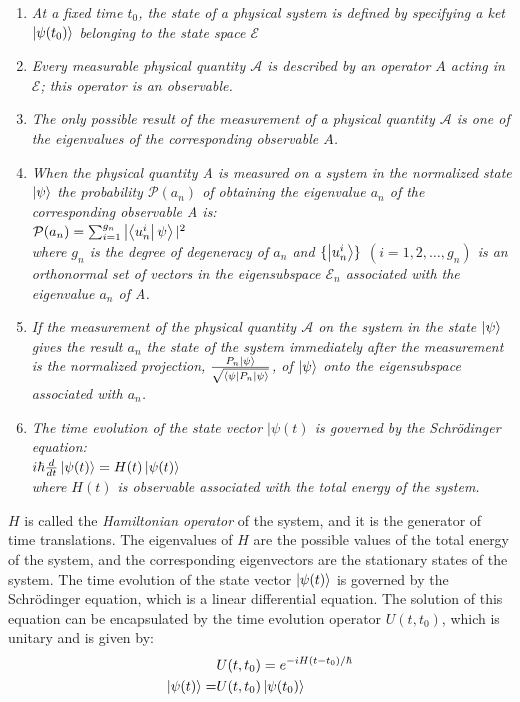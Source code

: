 \documentclass[
  journal=largetwo,
  year=2023,
]{cup-journal}
\begin{document}
\begin{enumerate}[itemsep=5px]
  \item \emph{At a fixed time \(t_0\), the state of a physical system is defined by specifying a ket \(\ket{\psi(t_0)}\) belonging to the state space \(\mathcal{E}\)}

  \item \emph{Every measurable physical quantity \(\mathcal{A}\) is described by an operator \(A\) acting in \(\mathcal{E}\); this operator is an observable.}

  \item \emph{The only possible result of the measurement of a physical quantity \(\mathcal{A}\) is one of the eigenvalues of the corresponding observable \(A\).}

  \item \emph{When the physical quantity A is measured on a system in the normalized state \(\ket{\psi}\) the probability \(\mathcal{P}(a_n)\)  of obtaining the eigenvalue \(a_n\) of the corresponding observable A is: \\
          \( \mathcal{P}(a_n) = \sum_{i=1}^{g_n}\ket{\bra{u_n^i}\psi}|^2 \) \\
          where \(g_n\) is the degree of degeneracy of \(a_n\) and \( \{ \ket{u_n^i} \} \) \( (i=1,2,\ldots, g_n) \) is an orthonormal set of vectors in the eigensubspace \(\mathcal{E}_n\) associated with the eigenvalue \(a_n\) of A.}

  \item \emph{If the measurement of the physical quantity \(\mathcal{A}\) on the system in the state \(\ket{\psi }\) gives the result \(a_n\) the state of the system immediately after the measurement is the normalized projection, \(\frac{P_n\ket{\psi }}{\sqrt{\bra{\psi }P_n\ket{\psi }} }\), of \(\ket{\psi }\) onto the eigensubspace associated with \(a_n\).}

  \item \emph{The time evolution of the state vector \(|\psi (t)\) is governed by the Schrödinger equation: \\
          \(i\hbar \frac{d}{dt}\ket{\psi(t)} = H(t)\ket{\psi(t)}\) \\
          where \(H(t)\) is observable associated with the total energy of the system.}\label{post:schroedinger}
\end{enumerate}

\noindent \(H\) is called the {\it Hamiltonian operator} of the system, and it is the generator of time translations. The eigenvalues of \(H\) are the possible values of the total energy of the system, and the corresponding eigenvectors are the stationary states of the system.
The time evolution of the state vector \(\ket{\psi(t)}\) is governed by the Schrödinger equation, which is a linear differential equation. The solution of this equation can be encapsulated by the time evolution operator \(U(t,t_0)\), which is unitary and is given by:
\begin{align}
                   & U(t,t_0)       = e^{-iH(t-t_0)/\hbar}     \\
  \ket{\psi(t)}  = & U(t,t_0)\ket{\psi(t_0)}\label{eq:unitary}
\end{align}
\end{document}
